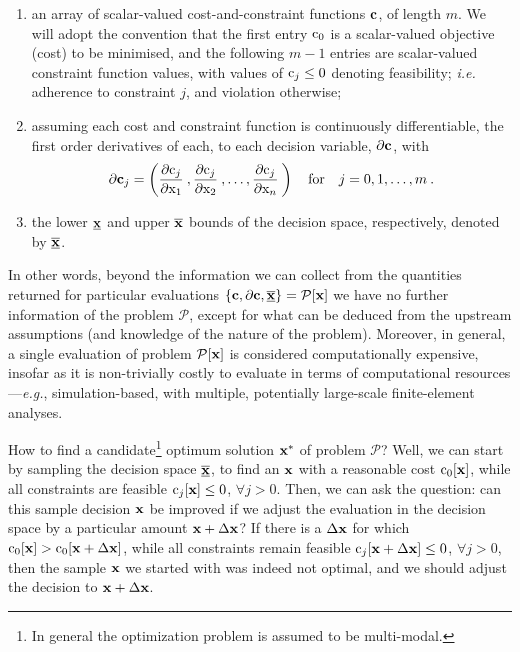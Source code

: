 \documentclass[11pt]{article}
\begin{document}
\begin{enumerate}[label=(\roman*)]
  \item an array of scalar-valued cost-and-constraint functions $\mathbf{c}$, of length $m$. We will adopt the convention that the first entry $\textrm{c}_0$ is a scalar-valued objective (cost) to be minimised, and the following $m-1$ entries are scalar-valued constraint function values, with values of $\textrm{c}_j \leq 0$ denoting feasibility; \emph{i.e.} adherence to constraint $j$, and violation otherwise;
  \item assuming each cost and constraint function is continuously differentiable, the first order derivatives of each, to each decision variable, $\mathbf{\partial c}$, with
\begin{equation}
\mathbf{\partial c }_j = \left( \frac{\partial \textrm{c}_j}{\partial \textrm{x}_1 } \:,  \frac{\partial \textrm{c}_j}{\partial \textrm{x}_2} \: , \ldots,  \frac{\partial \textrm{c}_j}{\partial \textrm{x}_n} \: \right) \quad \text{for} \quad j = 0,1, \ldots, m \:.
\end{equation}
  \item the  lower $\underline{\mathbf{x}}$ and upper $\overline{\mathbf{x}}$ bounds of the decision space, respectively, denoted by $\underline{\overline{\mathbf{x}}}$.
\end{enumerate}

In other words, beyond the information we can collect from the quantities returned for particular evaluations $\left\{\mathbf{c}, \partial \mathbf{c}, \underline{\overline{\mathbf{x}}}\right\}=\mathcal{P}[\mathbf{x}]$ we have no further information of the problem $\mathcal{P}$, except for what can be deduced from the upstream assumptions (and knowledge of the nature of the problem). Moreover, in general, a single evaluation of problem $\mathcal{P}[\mathbf{x}]$ is considered computationally expensive, insofar as it is non-trivially costly to evaluate in terms of computational resources---\emph{e.g.}, simulation-based, with multiple, potentially large-scale finite-element analyses.

How to find a candidate\footnote{In general the optimization problem is assumed to be multi-modal.} optimum solution $\mathbf{x}^\ast$ of problem $\mathcal{P}$?  Well, we can start by sampling the decision space $\underline{\overline{\mathbf{x}}}$, to find an $\mathbf{x}$ with a reasonable cost $\textrm{c}_0 [\mathbf{x}]$, while all constraints are feasible $\textrm{c}_j [\mathbf{x}] \leq 0$, $\forall j > 0$. Then, we can ask the question: can this sample decision $\mathbf{x}$ be improved if we adjust the evaluation in the decision space by a particular amount $\mathbf{x} + \Delta \mathbf{x}$? If there is a $\Delta \mathbf{x}$ for which $\textrm{c}_0 [\mathbf{x}] > \textrm{c}_0 [\mathbf{x} + \Delta\mathbf{x}]$, while all constraints remain feasible $\textrm{c}_j [\mathbf{x} + \Delta \mathbf{x}] \leq 0$, $\forall j > 0$, then the sample $\mathbf{x}$ we started with was indeed not optimal, and we should adjust the decision to $\mathbf{x} + \Delta \mathbf{x}$.
\end{document}
